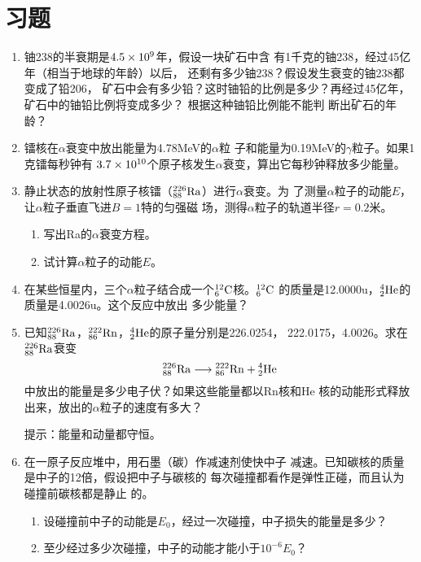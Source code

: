 \section*{习题}
\begin{enumerate}
    \item 铀238的半衰期是$4.5\x 10^9$年，假设一块矿石中含
有1千克的铀238，经过45亿年（相当于地球的年龄）以后，
还剩有多少铀238？假设发生衰变的铀238都变成了铅206，
矿石中会有多少铅？这时铀铅的比例是多少？再经过45亿年，
矿石中的铀铅比例将变成多少？ 根据这种铀铅比例能不能判
断出矿石的年龄？
\item 镭核在$\alpha$衰变中放出能量为4.78MeV的$\alpha$粒
子和能量为0.19MeV的$\gamma$粒子。如果1克镭每秒钟有
$3.7\x10^{10}$个原子核发生$\alpha$衰变，算出它每秒钟释放多少能量。
\item 静止状态的放射性原子核镭（$\atom{Ra}{226}{88}$）进行$\alpha$衰变。为
了测量$\alpha$粒子的动能$E$，让$\alpha$粒子垂直飞进$B=1$特的匀强磁
场，测得$\alpha$粒子的轨道半径$r=0.2$米。
\begin{enumerate}
    \item 写出Ra的$\alpha$衰变方程。
    \item 试计算$\alpha$粒子的动能$E$。
\end{enumerate}

\item 在某些恒星内，三个$\alpha$粒子结合成一个$\atom{C}{12}{6}$核。$\atom{C}{12}{6}$
的质量是12.0000u，$\atom{He}{4}{2}$的质量是4.0026u。这个反应中放出
多少能量？
\item 已知$\atom{Ra}{226}{88}$，$\atom{Rn}{222}{86}$，$\atom{He}{4}{2}$的原子量分别是226.0254，
222.0175，4.0026。求在$\atom{Ra}{226}{88}$衰变
\[\atom{Ra}{226}{88}\longrightarrow \atom{Rn}{222}{86}+\atom{He}{4}{2}\]
中放出的能量是多少电子伏？如果这些能量都以Rn核和He
核的动能形式释放出来，放出的$\alpha$粒子的速度有多大？

提示：能量和动量都守恒。

\item 在一原子反应堆中，用石墨（碳）作减速剂使快中子
减速。已知碳核的质量是中子的12倍，假设把中子与碳核的
每次碰撞都看作是弹性正碰，而且认为碰撞前碳核都是静止
的。
\begin{enumerate}
    \item 设碰撞前中子的动能是$E_0$，经过一次碰撞，中子损失的能量是多少？
    \item 至少经过多少次碰撞，中子的动能才能小于$10^{-6}E_0$？
\end{enumerate}

\end{enumerate}


































